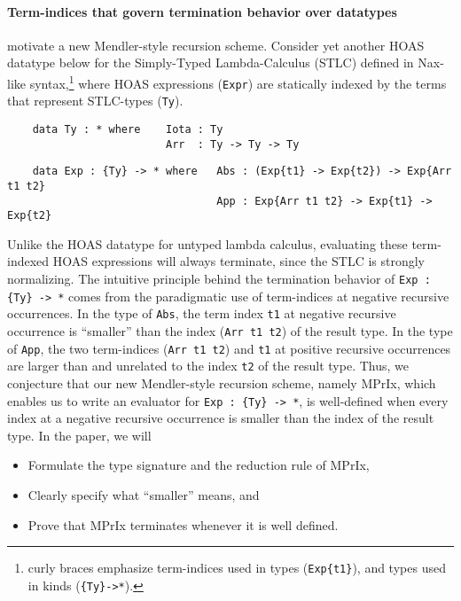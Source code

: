 \documentclass[a4paper]{easychair} %
\begin{document}
\paragraph{Term-indices that govern termination behavior over datatypes\!\!\!}
motivate a new Mendler-style recursion scheme.
Consider yet another HOAS datatype below for the Simply-Typed Lambda-Calculus (STLC)
defined in Nax-like syntax,\footnote{curly braces emphasize
  term-indices used in types (\texttt{Exp\{t1\}}),
  and types used in kinds (\texttt{\{Ty\}\;->\;*}).}
where HOAS expressions (\texttt{Expr}) are
statically indexed by the terms that represent STLC-types (\texttt{Ty}).
\begin{verbatim}
    data Ty : * where    Iota : Ty
                         Arr  : Ty -> Ty -> Ty
\end{verbatim}\vspace*{-2ex}
\begin{verbatim}
    data Exp : {Ty} -> * where   Abs : (Exp{t1} -> Exp{t2}) -> Exp{Arr t1 t2}
                                 App : Exp{Arr t1 t2} -> Exp{t1} -> Exp{t2}
\end{verbatim}
Unlike the HOAS datatype for untyped lambda calculus, evaluating
these term-indexed HOAS expressions will always terminate,
since the STLC is strongly normalizing.
The intuitive principle behind the termination behavior of \texttt{Exp\,:\,\{Ty\}\,->\,*}
comes from the paradigmatic use of term-indices at negative recursive occurrences.  
In the type of \texttt{Abs}, the term index \texttt{t1}
at negative recursive occurrence is ``smaller'' than the index
(\texttt{Arr t1 t2}) of the result type. In the type of \texttt{App},
the two term-indices (\texttt{Arr t1 t2}) and \texttt{t1} at positive recursive
occurrences are larger than and unrelated to the index \texttt{t2} of the result type.
Thus, we conjecture that our new Mendler-style recursion scheme, namely \textsf{MPrIx},
which enables us to write an evaluator for  \texttt{Exp\,:\,\{Ty\}\,->\,*}, 
is well-defined when every index at a negative recursive occurrence is
smaller than the index of the result type.
In the paper, we will \vspace*{-.5ex}
\begin{itemize}
 \item Formulate the type signature and the reduction rule of \textsf{MPrIx},
 \vspace*{-1ex}
 \item Clearly specify what ``smaller'' means, and
 \vspace*{-1ex}
 \item Prove that \textsf{MPrIx} terminates whenever it is well defined.
 \vspace*{-1ex}
\end{itemize}
\vspace{-1ex}
\end{document}
